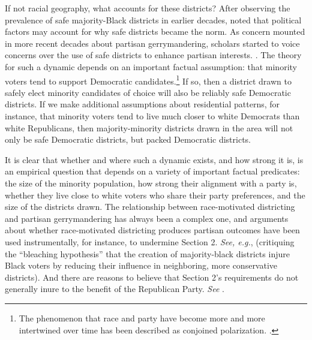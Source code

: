 \documentclass[12pt]{article}
\begin{document}
If not racial geography, what accounts for these districts?  After observing the prevalence of safe majority-Black districts in earlier decades, \cite{pildes2007decline} noted that political factors may account for why safe districts became the norm.  As concern mounted in more recent decades about partisan gerrymandering, scholars started to voice concerns over the use of safe districts to enhance partisan interests. \cite{pildes2001voting,issacharoff2002gerrymandering}. The theory for such a dynamic depends on an important factual assumption: that minority voters tend to support Democratic candidates.\footnote{The phenomenon that race and party have become more and more intertwined over time has been described as conjoined polarization. \cite{cain2016blurred}.}  If so, then a district drawn to safely elect minority candidates of choice will also be reliably safe Democratic districts.  If we make additional assumptions about residential patterns, for instance, that minority voters tend to live much closer to white Democrats than white Republicans, then majority-minority districts drawn in the area will not only be safe Democratic districts, but packed Democratic districts.

It is clear that whether and where such a dynamic exists, and how strong it is, is an empirical question that depends on a variety of important factual predicates: the size of the minority population, how strong their alignment with a party is, whether they live close to white voters who share their party preferences, and the size of the districts drawn.  The relationship between race-motivated districting and partisan gerrymandering has always been a complex one, and arguments about whether race-motivated districting produces partisan outcomes have been used instrumentally, for instance, to undermine Section 2. \textit{See, e.g.}, \cite{karlan1997loss} (critiquing the ``bleaching hypothesis'' that the creation of majority-black districts injure Black voters by reducing their influence in neighboring, more conservative districts). And there are reasons to believe that Section 2's requirements do not generally inure to the benefit of the Republican Party. \textit{See} \cite{cox2011reconsidering}.
\end{document}
